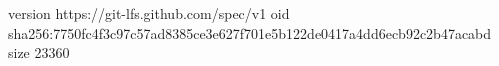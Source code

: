 version https://git-lfs.github.com/spec/v1
oid sha256:7750fc4f3c97c57ad8385ce3e627f701e5b122de0417a4dd6ecb92c2b47acabd
size 23360
